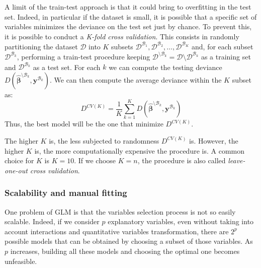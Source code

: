 \documentclass[a4paper, nobind]{templates/ociamthesis}
\theoremstyle{definition}
\theoremstyle{definition}
\theoremstyle{definition}
\theoremstyle{remark}
\begin{document}
A limit of the train-test approach is that it could bring to overfitting in the test set. Indeed, in particular if the dataset is small, it is possible that a specific set of variables minimizes the deviance on the test set just by chance. To prevent this, it is possible to conduct a \emph{K-fold cross validation}. This consists in randomly partitioning the dataset \(\mathcal{D}\) into \(K\) subsets \(\mathcal{D}^{\mathcal{B}_1}, \mathcal{D}^{\mathcal{B}_2}, \dots, \mathcal{D}^{\mathcal{B}_K}\) and, for each subset \(\mathcal{D}^{\mathcal{B}_k}\), performing a train-test procedure keeping \(\mathcal{D}^{\setminus \mathcal{B}_k} = \mathcal{D} \setminus \mathcal{D}^{\mathcal{B}_k}\) as a training set and \(\mathcal{D}^{\mathcal{B}_k}\) as a test set. For each \(k\) we can compute the testing deviance \(D\left( \hat{\boldsymbol{\beta}}^{\setminus \mathcal{B}_k}, \boldsymbol{y}^{\mathcal{B}_k} \right)\). We can then compute the average deviance within the \(K\) subset as:
\[
D^{CV(K)} = \frac{1}{K} \sum_{k=1}^{K}{D\left( \hat{\boldsymbol{\beta}}^{\setminus \mathcal{B}_k}, \boldsymbol{y}^{\mathcal{B}_k} \right)}
\]
Thus, the best model will be the one that minimize \(D^{CV(K)}\).

The higher \(K\) is, the less subjected to randomness \(D^{CV(K)}\) is. However, the higher \(K\) is, the more computationally expensive the procedure is. A common choice for \(K\) is \(K=10\). If we choose \(K=n\), the procedure is also called \emph{leave-one-out cross validation}.

\hypertarget{scalability-and-manual-fitting}{%
\subsubsection{Scalability and manual fitting}\label{scalability-and-manual-fitting}}

One problem of GLM is that the variables selection process is not so easily scalable. Indeed, if we consider \(p\) explanatory variables, even without taking into account interactions and quantitative variables transformation, there are \(2^p\) possible models that can be obtained by choosing a subset of those variables. As \(p\) increases, building all these models and choosing the optimal one becomes unfeasible.
\end{document}
